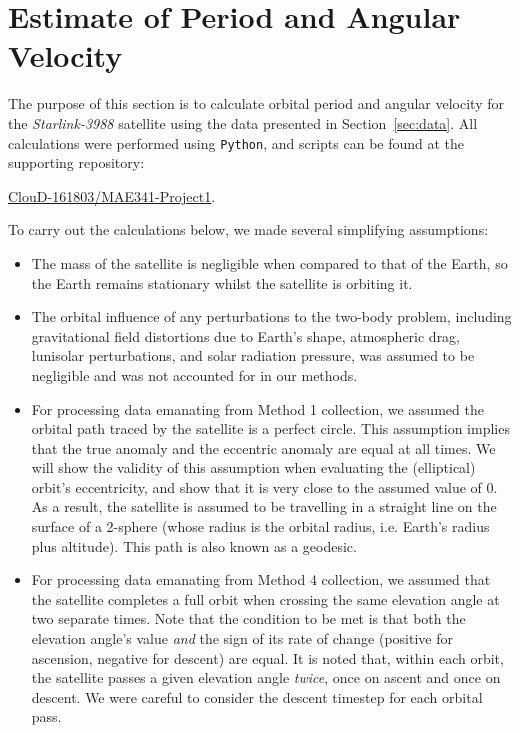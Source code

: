 \documentclass{article}
\begin{document}
\section{Estimate of Period and Angular Velocity}

The purpose of this section is to calculate orbital period and angular velocity for the \textit{Starlink-3988} satellite using the data presented in Section~\ref{sec:data}. All calculations were performed using \texttt{Python}, and scripts can be found at the supporting repository:
\begin{center}
    \href{https://github.com/ClouD-161803/MAE341-Project1}{ClouD-161803/MAE341-Project1}.
\end{center}

To carry out the calculations below, we made several simplifying assumptions:

\begin{itemize}
    \item The mass of the satellite is negligible when compared to that of the Earth, so the Earth remains stationary whilst the satellite is orbiting it.
    \item The orbital influence of any perturbations to the two-body problem, including gravitational field distortions due to Earth's shape, atmospheric drag, lunisolar perturbations, and solar radiation pressure, was assumed to be negligible and was not accounted for in our methods.
    \item For processing data emanating from Method 1 collection, we assumed the orbital path traced by the satellite is a perfect circle. This assumption implies that the true anomaly and the eccentric anomaly are equal at all times. We will show the validity of this assumption when evaluating the (elliptical) orbit's eccentricity, and show that it is very close to the assumed value of $0$. As a result, the satellite is assumed to be travelling in a straight line on the surface of a 2-sphere (whose radius is the orbital radius, i.e. Earth's radius plus altitude). This path is also known as a geodesic.
    \item For processing data emanating from Method 4 collection, we assumed that the satellite completes a full orbit when crossing the same elevation angle at two separate times. Note that the condition to be met is that both the elevation angle's value \emph{and} the sign of its rate of change (positive for ascension, negative for descent) are equal. It is noted that, within each orbit, the satellite passes a given elevation angle \emph{twice}, once on ascent and once on descent. We were careful to consider the descent timestep for each orbital pass. 
\end{itemize}
\end{document}
